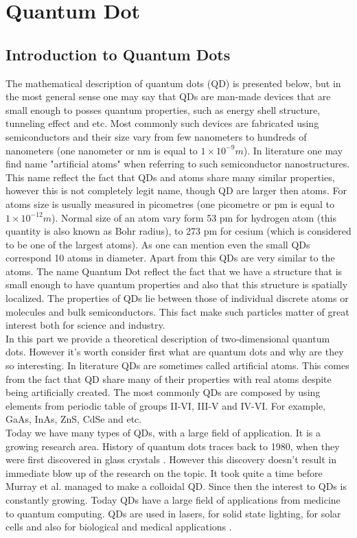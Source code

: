 \chapter{Quantum Dot}

\section{Introduction to Quantum Dots}

The mathematical description of quantum dots (QD) is presented below,
but in the most general sense one may say that QDs are man-made
devices that are small enough to posses quantum properties, such as
energy shell structure, tunneling effect and etc. Most commonly such
devices are fabricated using semiconductors and their size vary from
few nanometers to hundreds of nanometers (one nanometer or nm is equal
to $1\times 10^{-9} m$). In literature one may find name "artificial
atoms" when referring to such semiconductor nanostructures. This name
reflect the fact that QDs and atoms share many similar properties,
however this is not completely legit name, though QD are larger then
atoms. For atoms size is usually measured in picometres (one picometre
or pm is equal to $1\times 10^{-12} m$).  Normal size of an atom vary
form 53 pm for hydrogen atom (this quantity is also known as Bohr
radius), to 273 pm for cesium (which is considered to be one of the
largest atoms). As one can mention even the small QDs correspond 10
atoms in diameter. Apart from this QDs are very similar to the
atoms. The name Quantum Dot reflect the fact that we have a structure
that is small enough to have quantum properties and also that this
structure is spatially localized. The properties of QDs lie between
those of individual discrete atoms or molecules and bulk
semiconductors. This fact make such particles matter of great interest
both for science and industry.\\ In this part we provide a theoretical
description of two-dimensional quantum dots. However it's worth
consider first what are quantum dots and why are they so
interesting. In literature QDs are sometimes called artificial
atoms. This comes from the fact that QD share many of their properties
with real atoms despite being artificially created. The most commonly
QDs are composed by using elements from periodic table of groups
II-VI, III-V and IV-VI. For example, GaAs, InAs, ZnS, CdSe and
etc.\\ Today we have many types of QDs, with a large field of
application. It is a growing research area. History of quantum dots
traces back to 1980, when they were first discovered in glass crystals
\cite{ekimovaiQuantumSizeEffect1981}. However this discovery doesn't
result in immediate blow up of the research on the topic. It took
quite a time before Murray et
al. \cite{murraySynthesisCharacterizationNearly1993} managed to make a
colloidal QD. Since then the interest to QDs is constantly
growing. Today QDs have a large field of applications from medicine to
quantum computing. QDs are used in lasers, for solid state lighting,
for solar cells and also for biological and medical applications
\cite{zhuQuantumDots2013}.  \\

